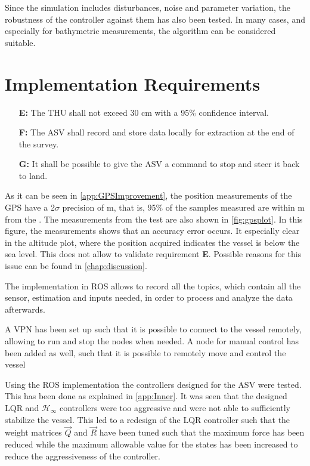 Since the simulation includes disturbances, noise and parameter variation, the robustness of the controller against them has also been tested. In many cases, and especially for bathymetric measurements, the algorithm can be considered suitable.


\section{Implementation Requirements}
\begin{itemize}
  \item[\textbf{E:}] The THU shall not exceed 30 cm with a 95\% confidence interval.
  \item[\textbf{F:}] The ASV shall record and store data locally for extraction at the end of the survey.
  \item[\textbf{G:}] It shall be possible to give the ASV a command to stop and steer it back to land.
\end{itemize}

As it can be seen in \autoref{app:GPSImprovement}, the position measurements of the GPS have a 2$\sigma$ precision of  m, that is, 95\% of the samples measured are within  m from the . The measurements from the test are also shown in \autoref{fig:gpsplot}. In this figure, the measurements shows that an accuracy error occurs. It especially clear in the altitude plot, where the position acquired indicates the vessel is below the sea level. This does not allow to validate requirement \textbf{E}. Possible reasons for this issue can be found in \autoref{chap:discussion}. 


The implementation in ROS allows to record all the topics, which contain all the sensor, estimation and inputs needed, in order to process and analyze the data afterwards.

A VPN has been set up such that it is possible to connect to the vessel remotely, allowing to run and stop the nodes when needed. A node for manual control has been added as well, such that it is possible to remotely move and control the vessel

Using the ROS implementation the controllers designed for the ASV were tested. This has been done as explained in \autoref{app:Inner}. It was seen that the designed LQR and $\mathcal{H}_\infty$ controllers were too aggressive and were not able to sufficiently stabilize the vessel. This led to a redesign of the LQR controller such that the weight matrices $\vec{Q}$ and $\vec{R}$ have been tuned such that the maximum force has been reduced while the maximum allowable value for the states has been increased to reduce the aggressiveness of the controller.
  
